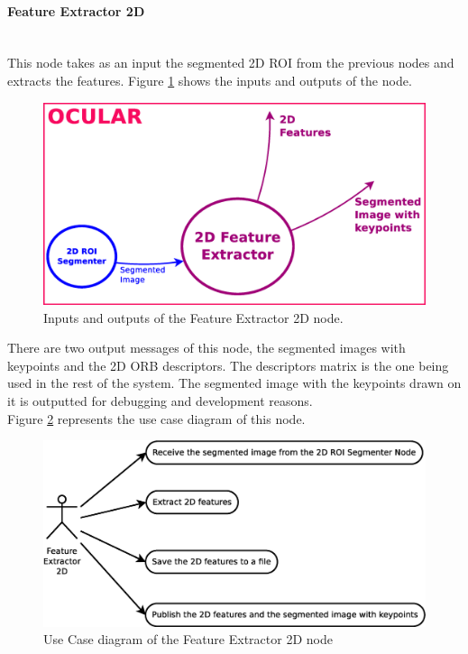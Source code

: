 
\paragraph{Feature Extractor 2D}\mbox{}\\

	This node takes as an input the segmented 2D ROI from the previous nodes and extracts the features. 
	Figure \ref{node_fe2d} shows the inputs and outputs of the node. 

		\begin{figure}[H]
			\begin{center}
			\includegraphics[width=0.5\linewidth]{img/diagrams/node_fe2d.eps}
			\caption[Feature Extractor 2D node I/O]{Inputs and outputs of the Feature Extractor 2D node.}		
			\label{node_fe2d}
			\end{center}
		\end{figure}

	There are two output messages of this node, the segmented images with keypoints and the 2D ORB descriptors. 
	The descriptors matrix is the one being used in the rest of the system. 
	The segmented image with the keypoints drawn on it is outputted for debugging and development reasons. 
	\\

	Figure  \ref{uc_fe2d} represents the use case diagram of this node. 
	\begin{figure}[H]
		\centering
			\includegraphics[scale=0.4]{img/diagrams/uc_feature_extractor_2d.eps}
			\caption[Use case diagram Feature Extractor 2D node]{Use Case diagram of the Feature Extractor 2D node}
		\label{uc_fe2d}
	\end{figure}

